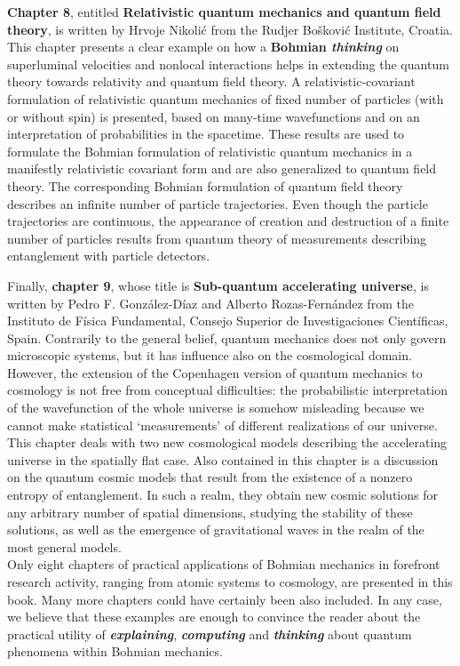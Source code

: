 \documentclass[onecolumn,nofootinbib, secnumarabic, amsmath, nobibnotes,12pt,aps,pra]{revtex4-1}
\begin{document}
\textbf{Chapter 8}, entitled \textbf{Relativistic quantum mechanics and quantum field theory}, is written by Hrvoje Nikoli\'c from the Rudjer Bo\v{s}kovi\'{c} Institute, Croatia. This chapter presents a clear example on how a \textbf{Bohmian \emph{thinking}} on superluminal velocities and nonlocal interactions helps in extending the quantum theory towards relativity and quantum field theory. A relativistic-covariant formulation of relativistic quantum mechanics of fixed number of particles (with or without spin) is presented, based on many-time wavefunctions and on an interpretation of probabilities in the spacetime. These results are used to formulate the Bohmian formulation of relativistic quantum mechanics in a manifestly relativistic covariant form and are also generalized to quantum field theory. The corresponding Bohmian formulation of quantum field theory describes an infinite number of particle trajectories. Even though the particle trajectories are continuous, the appearance of creation and destruction of a finite number of particles results from quantum theory of measurements describing entanglement with particle detectors.

Finally, \textbf{chapter 9}, whose title is \textbf{Sub-quantum accelerating universe}, is written by Pedro F. Gonz\'alez-D\'{i}az and Alberto Rozas-Fern\'andez from the Instituto de F\'isica Fundamental, Consejo Superior de Investigaciones Cient\'ificas, Spain. Contrarily to the general belief, quantum mechanics does not only govern microscopic systems, but it has influence also on the cosmological domain. However, the extension of the Copenhagen version of quantum mechanics to cosmology is not free from conceptual difficulties: the probabilistic interpretation of the wavefunction of the whole universe is somehow misleading because we cannot make statistical `measurements' of different realizations of our universe. This chapter deals with two new cosmological models describing the accelerating universe in the spatially flat case.  Also contained in this chapter is a discussion on the quantum cosmic models that result from the existence of a nonzero entropy of entanglement. In such a realm, they obtain new cosmic solutions for any arbitrary number of spatial dimensions, studying the stability of these solutions, as well as the emergence of gravitational waves in the realm of the most general models. \\


Only eight chapters of practical applications of Bohmian mechanics in forefront research activity, ranging from atomic systems to cosmology, are presented in this book. Many more chapters could have certainly been also included. In any case, we believe that  these examples are enough to convince the reader about the practical utility of \textbf{\emph{explaining}}, \textbf{\emph{computing}} and \textbf{\emph{thinking}} about quantum phenomena within Bohmian mechanics. 
\end{document}
